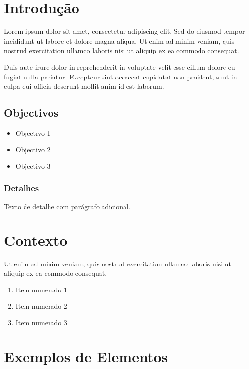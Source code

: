 \documentclass[
  a4paper,
  12pt
]{DPQISTreport}
\begin{document}

\section{Introdução}

Lorem ipsum dolor sit amet, consectetur adipiscing elit. Sed do eiusmod tempor incididunt ut labore et dolore magna aliqua. Ut enim ad minim veniam, quis nostrud exercitation ullamco laboris nisi ut aliquip ex ea commodo consequat.

Duis aute irure dolor in reprehenderit in voluptate velit esse cillum dolore eu fugiat nulla pariatur. Excepteur sint occaecat cupidatat non proident, sunt in culpa qui officia deserunt mollit anim id est laborum.

\subsection{Objectivos}

\begin{itemize}
    \item Objectivo 1
    \item Objectivo 2
    \item Objectivo 3
\end{itemize}

\subsubsection{Detalhes}

Texto de detalhe com parágrafo adicional.

\section{Contexto}

Ut enim ad minim veniam, quis nostrud exercitation ullamco laboris nisi ut aliquip ex ea commodo consequat.

\begin{enumerate}
    \item Item numerado 1
    \item Item numerado 2
    \item Item numerado 3
\end{enumerate}

\section{Exemplos de Elementos}
\end{document}
